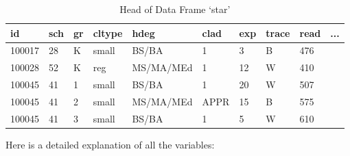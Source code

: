 \documentclass{article}
\begin{document}
\begin{table}[h]
    \centering
    \caption{Head of Data Frame ‘star’}
    \label{table:data}
    \begin{tabular}{|l|l|l|l|l|l|l|l|l|l|}
    \hline
    id     & sch & gr & cltype & hdeg      & clad & exp & trace & read & ... \\ \hline
    100017 & 28  & K  & small  & BS/BA     & 1    & 3   & B     & 476  &     \\ \hline
    100028 & 52  & K  & reg    & MS/MA/MEd & 1    & 12  & W     & 410  &     \\ \hline
    100045 & 41  & 1  & small  & BS/BA     & 1    & 20  & W     & 507  &     \\ \hline
    100045 & 41  & 2  & small  & MS/MA/MEd & APPR & 15  & B     & 575  &     \\ \hline
    100045 & 41  & 3  & small  & BS/BA     & 1    & 5   & W     & 610  &     \\ \hline
    \end{tabular}
\end{table}

Here is a detailed explanation of all the variables:
\end{document}
